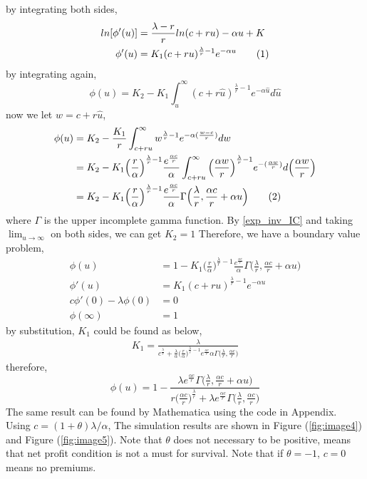 \documentclass[12pt]{article}
\newcommand\numberthis{\addtocounter{equation}{1}\tag{\theequation}}
\begin{document}
by integrating both sides,
\begin{align*}
    ln[\phi'(u)]&=\frac{\lambda-r}{r}ln(c+ru)-\alpha u+K\\
    \phi'(u)&=K_1(c+ru)^{\frac{\lambda}{r}-1}e^{-\alpha u}\numberthis \label{exp_inv_differential}
\end{align*}
by integrating again,
\begin{equation}
    \phi(u)=K_2-K_1\int^{\infty}_{u}(c+r\hat{u})^{\frac{\lambda}{r}-1}e^{-\alpha \hat{u}}d\hat{u}
\end{equation}
now we let \(w=c+r\hat{u}\),
\begin{align*}
    \phi(u)&=K_2-\frac{K_1}{r}\int^{\infty}_{c+ru}w^{\frac{\lambda}{r}-1}e^{-\alpha (\frac{w-c}{r})}dw\\
    &=K_2-K_1\Big(\frac{r}{\alpha}\Big)^{\frac{\lambda}{r}-1}\frac{e^{\frac{\alpha c}{r}}}{\alpha}\int^{\infty}_{c+ru}\Big(\frac{\alpha w}{r}\Big)^{\frac{\lambda}{r}-1}e^{- (\frac{\alpha w}{r})}d\Big(\frac{\alpha w}{r}\Big)\\
    &=K_2-K_1\Big(\frac{r}{\alpha}\Big)^{\frac{\lambda}{r}-1}\frac{e^{\frac{\alpha c}{r}}}{\alpha}\Gamma\Big(\frac{\lambda}{r},\frac{\alpha c}{r}+\alpha u\Big)\numberthis
\end{align*}
where \(\Gamma\) is the upper incomplete gamma function. By \eqref{exp_inv_IC} and taking $\displaystyle\lim_{u\to \infty}$ on both sides, we can get \(K_2=1\)
Therefore, we have a boundary value problem,
\begin{align}
    \phi(u)&=1-K_1\Big(\frac{r}{\alpha}\Big)^{\frac{\lambda}{r}-1}\frac{e^{\frac{\alpha c}{r}}}{\alpha}\Gamma\Big(\frac{\lambda}{r},\frac{\alpha c}{r}+\alpha u\Big)\\
    \phi'(u)&=K_1(c+ru)^{\frac{\lambda}{r}-1}e^{-\alpha u}\\
    c\phi'(0)-\lambda\phi(0)&=0\\
    \phi(\infty)&=1
\end{align}
by substitution, $K_1$ could be found as below,
\begin{align*}
    K_1=\frac{\lambda}{c^{\frac{\lambda}{r}}+\frac{\lambda}{\alpha}\big(\frac{r}{\alpha}\big)^{\frac{\lambda}{r}-1}e^{\frac{\alpha c}{r}}{\alpha}\Gamma\big(\frac{\lambda}{r},\frac{\alpha c}{r}\big)}
\end{align*}
therefore,
\begin{equation}\label{survival-f-exp-with-r}
    \phi(u)=1-\frac{\lambda e^{\frac{\alpha c}{r}}\Gamma\big(\frac{\lambda}{r},\frac{\alpha c}{r}+\alpha u\big)}{r\big(\frac{\alpha c}{r}\big)^{\frac{\lambda}{r}}+\lambda e^{\frac{\alpha c}{r}}\Gamma\big(\frac{\lambda}{r},\frac{\alpha c}{r}\big)}
\end{equation}
The same result can be found by Mathematica using the code in Appendix.\\
Using \(c=(1+\theta)\lambda/\alpha\), The simulation results are shown in Figure (\ref{fig:image4}) and Figure (\ref{fig:image5}). Note that \(\theta\) does not necessary to be positive, means that net profit condition is not a must for survival. Note that if \(\theta=-1\), \(c=0\) means no premiums.
\end{document}
